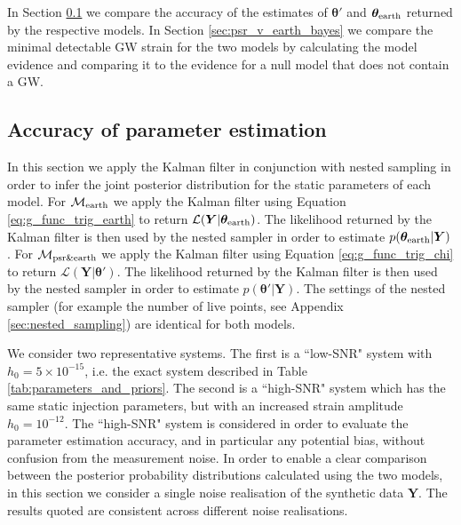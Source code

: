 \documentclass[fleqn,usenatbib,useAMS]{mnras}
\begin{document}
In Section \ref{sec:psr_v_earth_pe} we compare the accuracy of the estimates of $\boldsymbol{\theta'}$ and $\boldsymbol{\theta}_{\rm earth}$ returned by the respective models. In Section \ref{sec:psr_v_earth_bayes} we compare the minimal detectable GW strain for the two models by calculating the model evidence and comparing it to the evidence for a null model that does not contain a GW.

\subsection{Accuracy of parameter estimation}\label{sec:psr_v_earth_pe}

In this section we apply the Kalman filter in conjunction with nested sampling in order to infer the joint posterior distribution for the static parameters of each model. For $\mathcal{M}_{\rm earth}$ we apply the Kalman filter using Equation \eqref{eq:g_func_trig_earth} to return $\mathcal{L}(\boldsymbol{Y}| \boldsymbol{\theta}_{\rm earth})$. The likelihood returned by the Kalman filter is then used by the nested sampler in order to estimate $p(\boldsymbol{\theta}_{\rm earth} | \boldsymbol{Y})$. For $\mathcal{M}_{\rm psr \& earth}$ we apply the Kalman filter using Equation \eqref{eq:g_func_trig_chi} to return $\mathcal{L}(\boldsymbol{Y}| \boldsymbol{\theta}')$. The likelihood returned by the Kalman filter is then used by the nested sampler in order to estimate $p(\boldsymbol{\theta'} | \boldsymbol{Y})$. The settings of the nested sampler (for example the number of live points, see Appendix \ref{sec:nested_sampling}) are identical for both models. \newline 

We consider two representative systems. The first is a ``low-SNR" system with $h_0 = 5 \times 10^{-15}$, i.e. the exact system described in Table \ref{tab:parameters_and_priors}. The second is a ``high-SNR" system which has the same static injection parameters, but with an increased strain amplitude $h_0 = 10^{-12}$. The ``high-SNR" system is considered in order to evaluate the parameter estimation accuracy, and in particular any potential bias, without confusion from the measurement noise. In order to enable a clear comparison between the posterior probability distributions calculated using the two models, in this section we consider a single noise realisation of the synthetic data $\boldsymbol{Y}$. The results quoted are consistent across different noise realisations. \newline 
\end{document}
